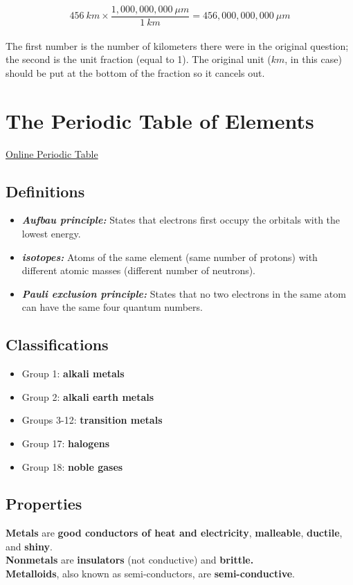 \documentclass[a4paper, 12pt]{article}
\begin{document}
$$456 \: km \times \frac{1,000,000,000 \: \mu m}{1 \: km} = 456,000,000,000 \: \mu m$$
\\
\noindent The first number is the number of kilometers there were in the original question; the second is the unit fraction (equal to 1). The original unit ($km$, in this case) should be put at the bottom of the fraction so it cancels out.

\section{The Periodic Table of Elements}

\textcolor{teal}{{\href{https://ptable.com}{Online Periodic Table}}}

\subsection{Definitions}
\begin{itemize}[leftmargin=*, nosep]
    \item \textbf{\textit{Aufbau principle:}} States that electrons first occupy the orbitals with the lowest energy.
    \item \textbf{\textit{isotopes:}} Atoms of the same element (same number of protons) with different atomic masses (different number of neutrons).
    \item \textbf{\textit{Pauli exclusion principle:}} States that no two electrons in the same atom can have the same four quantum numbers.
\end{itemize}

\subsection{Classifications}

\begin{itemize}[leftmargin=*, nosep]
    \item Group 1: \textbf{alkali metals}
    \item Group 2: \textbf{alkali earth metals}
    \item Groups 3-12: \textbf{transition metals}
    \item Group 17: \textbf{halogens}
    \item Group 18: \textbf{noble gases}
\end{itemize}

\subsection{Properties}
\textbf{Metals} are \textbf{good conductors of heat and electricity}, \textbf{malleable}, \textbf{ductile}, and \textbf{shiny}.
\\
\textbf{Nonmetals} are \textbf{insulators} (not conductive) and \textbf{brittle.}
\\
\textbf{Metalloids}, also known as semi-conductors, are \textbf{semi-conductive}.
\end{document}
